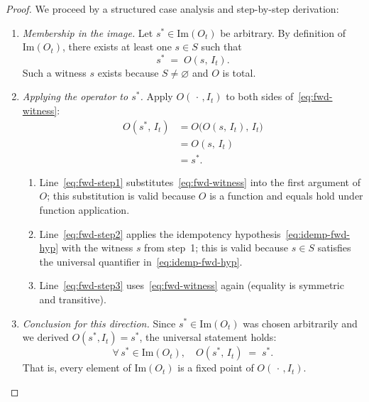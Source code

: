 \documentclass[12pt,openany]{book}
\newcommand{\calI}{\mathcal{I}}
\numberwithin{equation}{chapter}
\theoremstyle{plain}
\theoremstyle{definition}
\theoremstyle{remark}
\numberwithin{equation}{chapter}
\theoremstyle{plain}
\newcommand{\calS}{\mathcal{S}}
\def\calI{I}%
\def\calS{S}%
\begin{document}
\begin{proof}
\medskip
\noindent We proceed by a structured case analysis and step-by-step
derivation:
\begin{enumerate}
  \item \emph{Membership in the image.}
        Let $s^* \in \mathrm{Im}(O_t)$ be arbitrary.  By definition of
        $\mathrm{Im}(O_t)$, there exists at least one $s \in \calS$ such
        that
        \begin{equation}
          s^* \;=\; O(s,\,\calI_t).
          \label{eq:fwd-witness}
        \end{equation}
        Such a witness $s$ exists because $\calS \neq \varnothing$ and
        $O$ is total.

  \item \emph{Applying the operator to $s^*$.}
        Apply $O(\,\cdot\,,\calI_t)$ to both sides
        of~\eqref{eq:fwd-witness}:
        \begin{align}
          O(s^*,\,\calI_t)
            &= O\!\bigl(O(s,\,\calI_t),\,\calI_t\bigr)
               \label{eq:fwd-step1}\\
            &= O(s,\,\calI_t)
               \label{eq:fwd-step2}\\
            &= s^*.
               \label{eq:fwd-step3}
        \end{align}
        \begin{enumerate}
          \item Line~\eqref{eq:fwd-step1} substitutes~\eqref{eq:fwd-witness}
                into the first argument of $O$; this substitution is
                valid because $O$ is a function and equals hold under
                function application.
          \item Line~\eqref{eq:fwd-step2} applies the idempotency
                hypothesis~\eqref{eq:idemp-fwd-hyp} with the witness
                $s$ from step~1; this is valid because $s \in \calS$
                satisfies the universal quantifier
                in~\eqref{eq:idemp-fwd-hyp}.
          \item Line~\eqref{eq:fwd-step3} uses~\eqref{eq:fwd-witness}
                again (equality is symmetric and transitive).
        \end{enumerate}

  \item \emph{Conclusion for this direction.}
        Since $s^* \in \mathrm{Im}(O_t)$ was chosen arbitrarily and we
        derived $O(s^*, \calI_t) = s^*$, the universal statement holds:
        \begin{equation}
          \forall\, s^* \in \mathrm{Im}(O_t),\quad
          O(s^*,\,\calI_t) \;=\; s^*.
          \label{eq:fixpoint-fwd}
        \end{equation}
        That is, every element of $\mathrm{Im}(O_t)$ is a fixed point
        of $O(\,\cdot\,,\calI_t)$.
\end{enumerate}


\end{proof}
\end{document}
